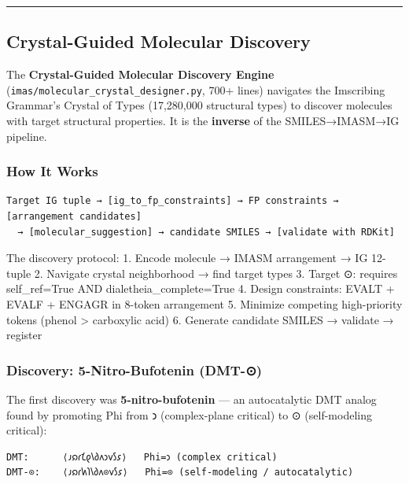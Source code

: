 \begin{center}\rule{0.5\linewidth}{0.5pt}\end{center}

\hypertarget{crystal-guided-molecular-discovery}{%
\subsection{Crystal-Guided Molecular
Discovery}\label{crystal-guided-molecular-discovery}}

The \textbf{Crystal-Guided Molecular Discovery Engine}
(\texttt{imas/molecular\_crystal\_designer.py}, 700+ lines) navigates
the Imscribing Grammar's Crystal of Types (17,280,000 structural types)
to discover molecules with target structural properties. It is the
\textbf{inverse} of the SMILES→IMASM→IG pipeline.

\hypertarget{how-it-works}{%
\subsubsection{How It Works}\label{how-it-works}}

\begin{verbatim}
Target IG tuple → [ig_to_fp_constraints] → FP constraints → [arrangement candidates]
  → [molecular_suggestion] → candidate SMILES → [validate with RDKit]
\end{verbatim}

The discovery protocol: 1. Encode molecule → IMASM arrangement → IG
12-tuple 2. Navigate crystal neighborhood → find target types 3. Target
⊙: requires self\_ref=True AND dialetheia\_complete=True 4. Design
constraints: EVALT + EVALF + ENGAGR in 8-token arrangement 5. Minimize
competing high-priority tokens (phenol \textgreater{} carboxylic acid)
6. Generate candidate SMILES → validate → register

\hypertarget{discovery-5-nitro-bufotenin-dmt-}{%
\subsubsection{Discovery: 5-Nitro-Bufotenin
(DMT-⊙)}\label{discovery-5-nitro-bufotenin-dmt-}}

The first discovery was \textbf{5-nitro-bufotenin} --- an autocatalytic
DMT analog found by promoting Phi from 𐑮 (complex-plane critical) to ⊙
(self-modeling critical):

\begin{verbatim}
DMT:      ⟨𐑨𐑸𐑩𐑗𐑞𐑘𐑔𐑵𐑮𐑫𐑕𐑭⟩   Phi=𐑮 (complex critical)
DMT-⊙:    ⟨𐑨𐑸𐑩𐑿𐑐𐑘𐑔𐑵⊙𐑫𐑕𐑭⟩   Phi=⊙ (self-modeling / autocatalytic)
\end{verbatim}

